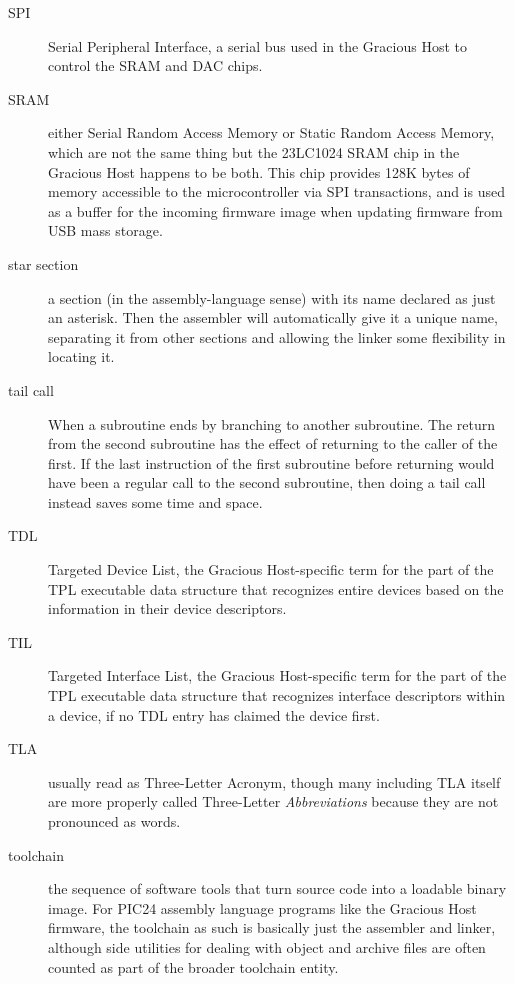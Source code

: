 \begin{description}
\item[SPI] Serial Peripheral Interface, a serial bus used in
the Gracious Host to control the SRAM and DAC chips.

\item[SRAM] either Serial Random Access Memory or Static Random Access
Memory, which are not the same thing but the 23LC1024 SRAM chip in the
Gracious Host happens to be both.  This chip provides 128K bytes of memory
accessible to the microcontroller via SPI transactions, and is used as
a buffer for the incoming firmware image when updating firmware from USB
mass storage.

\item[star section] a section (in the assembly-language sense) with
its name declared as just an asterisk.  Then the assembler will automatically
give it a unique name, separating it from other sections and allowing
the linker some flexibility in locating it.

\item[tail call]  When a subroutine ends by branching to another subroutine. 
The return from the second subroutine has the effect of returning to the
caller of the first.  If the last instruction of the first subroutine before
returning would have been a regular call to the second subroutine, then
doing a tail call instead saves some time and space.

\item[TDL] Targeted Device List, the Gracious Host-specific term for the
part of the TPL executable data structure that recognizes entire devices
based on the information in their device descriptors.

\item[TIL] Targeted Interface List, the Gracious Host-specific term for the
part of the TPL executable data structure that recognizes interface
descriptors within a device, if no TDL entry has claimed the device first.

\item[TLA] usually read as Three-Letter Acronym, though many including TLA
itself are more properly called Three-Letter \emph{Abbreviations} because
they are not pronounced as words.

\item[toolchain] the sequence of software tools that turn source code into a
loadable binary image.  For PIC24 assembly language programs like the
Gracious Host firmware, the toolchain as such is basically just the
assembler and linker, although side utilities for dealing with object and
archive files are often counted as part of the broader toolchain entity.


\end{description}
